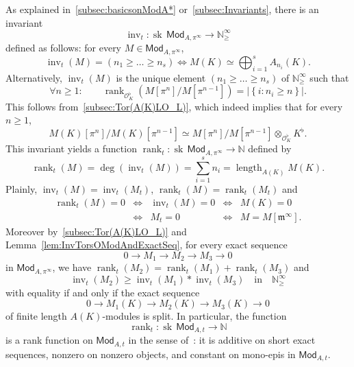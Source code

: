 \documentclass[11pt]{article}
\theoremstyle{definition}
\numberwithin{equation}{section}
\numberwithin{figure}{section}
\numberwithin{table}{section}
\newcommand{\Mod}{\mathsf{Mod}}
\DeclareMathOperator{\inv}{inv}
\DeclareMathOperator{\length}{length}
\DeclareMathOperator{\rank}{rank}
\DeclareMathOperator{\sk}{sk}
\let\oldforall\forall
\renewcommand*{\forall}{\mathrel{\oldforall}}
\begin{document}
\subsubsection{}

As explained in~\ref{subsec:basicsonModA*} or~\ref{subsec:Invariants}, there is an invariant
\[
\inv_{t}:\sk\,\Mod_{A,\pi^{\infty}}\rightarrow\mathbb{N}_{\geq}^{\infty}
\]
defined as follows: for every $M\in\Mod_{A,\pi^{\infty}}$,
\[
\inv_{t}(M)=(n_{1}\geq\dots\geq n_{s})\iff M(K)\simeq\bigoplus_{i=1}^{s}A_{n_{i}}(K).
\]
Alternatively, $\inv_{t}(M)$ is the unique element $(n_{1}\geq\dots\geq n_{s})$ of $\mathbb{N}_{\geq}^{\infty}$ such that
\[
\forall n\geq1:\qquad\rank_{\mathcal{O}_{K}^{\flat}}\left(M[\pi^{n}]/M[\pi^{n-1}]\right)=\left|\left\{ i:n_{i}\geq n\right\} \right|.
\]
This follows from~\ref{subsec:Tor(A(K)LO_L)}, which indeed implies that for every $n\geq1$,
\[
M(K)[\pi^{n}]/M(K)[\pi^{n-1}]\simeq M[\pi^{n}]/M[\pi^{n-1}]\otimes_{\mathcal{O}_{K}^{\flat}}K^{\flat}.
\]
This invariant yields a function $\rank_{t}:\sk\,\Mod_{A,\pi^{\infty}}\rightarrow\mathbb{N}$ defined by
\[
\rank_{t}(M)=\deg(\inv_{t}(M))=\sum_{i=1}^{s}n_{i}=\length_{A(K)}M(K).
\]
Plainly, $\inv_{t}(M)=\inv_{t}(M_{t})$, $\rank_{t}(M)=\rank_{t}(M_{t})$ and
\[
\begin{array}{rcccl}
\rank_{t}(M)=0 & \iff & \inv_{t}(M)=0 & \iff & {M}(K)=0\\
& \iff & M_{t}=0 & \iff & M=M[\mathfrak{m}^{\infty}].
\end{array}
\]
Moreover by~\ref{subsec:Tor(A(K)LO_L)} and Lemma~\ref{lem:InvTorsOModAndExactSeq}, for every exact sequence
\[
0\rightarrow M_{1}\rightarrow M_{2}\rightarrow M_{3}\rightarrow0
\]
in $\Mod_{A,\pi^{\infty}}$, we have $\rank_{t}(M_{2})=\rank_{t}(M_{1})+\rank_{t}(M_{3})$ and
\[
\inv_{t}(M_{2})\geq\inv_{t}(M_{1})\ast\inv_{t}(M_{3})\quad\text{in}\quad\mathbb{N}_{\geq}^{\infty}
\]
with equality if and only if the exact sequence
\[
0\rightarrow M_{1}(K)\rightarrow M_{2}(K)\rightarrow M_{3}(K)\rightarrow0
\]
of finite length $A(K)$-modules is split. In particular, the function
\[
\rank_{t}:\sk\,\Mod_{A,t}\rightarrow\mathbb{N}
\]
is a rank function on $\Mod_{A,t}$ in the sense of~\cite{Co16}: it is additive on short exact sequences, nonzero on nonzero objects, and constant on mono-epis in $\Mod_{A,t}$.

\subsubsection{}\label{subsec:rankfree/tors}
\end{document}
